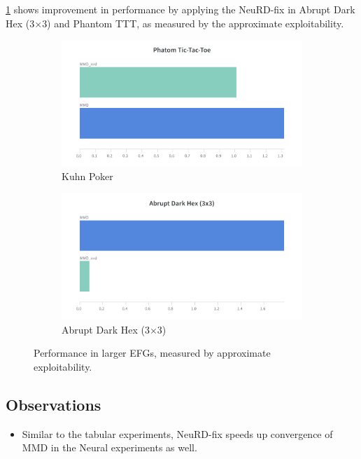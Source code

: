 \ref{fig:neural2} shows improvement in performance by applying the NeuRD-fix in Abrupt Dark Hex
(3$\times$3) and Phantom TTT, as measured by the approximate exploitability.
\begin{figure}[H]
	\centering
	\begin{subfigure}[b]{0.4\textwidth}
		\includegraphics[width=\textwidth]{figs/pttt.png}
		\caption{Kuhn Poker}
	\end{subfigure}
	\begin{subfigure}[b]{0.4\textwidth}
		\includegraphics[width=\textwidth]{figs/ahex33.png}
		\caption{Abrupt Dark Hex (3$\times$3)}
	\end{subfigure}
	\caption{Performance in larger EFGs, measured by approximate exploitability.}
	\label{fig:neural2}
\end{figure}


\subsection{Observations}
\begin{itemize}
	\item {Similar to the tabular experiments, NeuRD-fix speeds up convergence of MMD in the Neural experiments as well.
	      }
\end{itemize}